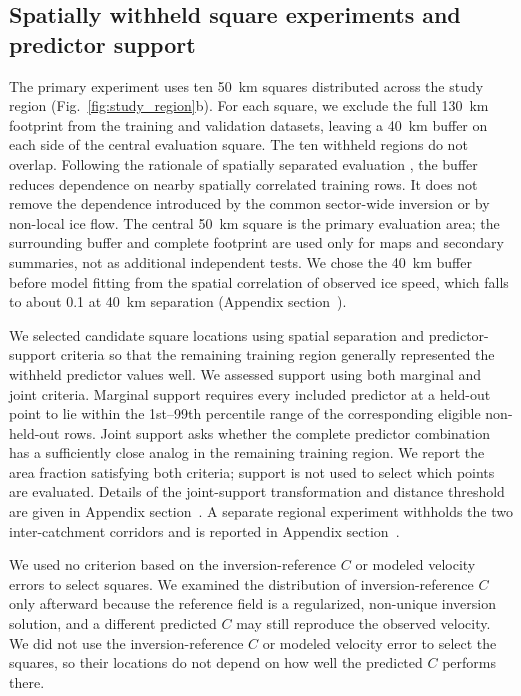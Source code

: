 \documentclass[review,jog]{igs}
\begin{document}
\subsection{Spatially withheld square experiments and predictor support}

The primary experiment uses ten 50~km squares distributed across the study
region (Fig.~\ref{fig:study_region}b). For each square, we exclude the full 130~km footprint from the training and validation datasets, leaving a 40~km buffer on each side of the central evaluation square. The ten withheld regions do
not overlap. Following the rationale of spatially separated evaluation \citep{roberts2017crossvalidation,valavi2019blockcv}, the buffer reduces dependence on nearby spatially correlated training rows. It does not remove the
dependence introduced by the common sector-wide inversion or by non-local ice
flow. The central 50~km square is the primary evaluation area; the surrounding
buffer and complete footprint are used only for maps and secondary summaries,
not as additional independent tests. We chose the 40~km buffer before model fitting from the spatial correlation of observed ice speed, which falls to about 0.1 at 40~km separation (Appendix section~).

We selected candidate square locations using spatial separation and predictor-support criteria so that the remaining training region generally represented the withheld predictor values well. We assessed support using both marginal and joint criteria. Marginal support requires every included predictor at a held-out point to lie
within the 1st--99th percentile range of the corresponding eligible non-held-out
rows. Joint support asks whether the complete predictor combination has a
sufficiently close analog in the remaining training region. We report the area fraction satisfying both criteria; support is not used to select which points are evaluated. Details of the joint-support
transformation and distance threshold are given in Appendix section~. A separate regional experiment withholds the two inter-catchment corridors and is reported in Appendix section~.

We used no criterion based on the inversion-reference $C$ or modeled velocity errors to select squares. We examined the distribution of inversion-reference $C$ only afterward because the reference field is a regularized, non-unique inversion solution, and a different predicted $C$ may still reproduce the observed velocity. We did not use the inversion-reference $C$ or modeled velocity error to select the squares, so their locations do not depend on how well the predicted $C$ performs there.
\end{document}
